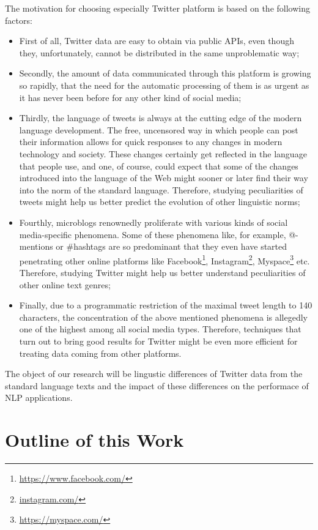 The motivation for choosing especially Twitter platform is based on the
following factors:
\begin{itemize}
  \item First of all, Twitter data are easy to obtain via public APIs, even
    though they, unfortunately, cannot be distributed in the same
    unproblematic way;
  \item Secondly, the amount of data communicated through this platform is
    growing so rapidly, that the need for the automatic processing of them is
    as urgent as it has never been before for any other kind of social media;
  \item Thirdly, the language of tweets is always at the cutting edge of the
    modern language development.  The free, uncensored way in which people can
    post their information allows for quick responses to any changes in modern
    technology and society.  These changes certainly get reflected in the
    language that people use, and one, of course, could expect that some of
    the changes introduced into the language of the Web might sooner or later
    find their way into the norm of the standard language.  Therefore,
    studying peculiarities of tweets might help us better predict the
    evolution of other linguistic norms;
  \item Fourthly, microblogs renownedly proliferate with various kinds of
    social media-specific phenomena.  Some of these phenomena like, for
    example, @-mentions or \#hashtags are so predominant that they even have
    started penetrating other online platforms like
    Facebook\footnote{\url{https://www.facebook.com/}},
    Instagram\footnote{\url{instagram.com/}},
    Myspace\footnote{\url{https://myspace.com/}} etc.  Therefore, studying
    Twitter might help us better understand peculiarities of other online text
    genres;
  \item Finally, due to a programmatic restriction of the maximal tweet length
    to 140 characters, the concentration of the above mentioned phenomena is
    allegedly one of the highest among all social media types.  Therefore,
    techniques that turn out to bring good results for Twitter might be even
    more efficient for treating data coming from other platforms.
\end{itemize}

The object of our research will be lingustic differences of Twitter
data from the standard language texts and the impact of these
differences on the performace of NLP applications.

\section*{Outline of this Work}
